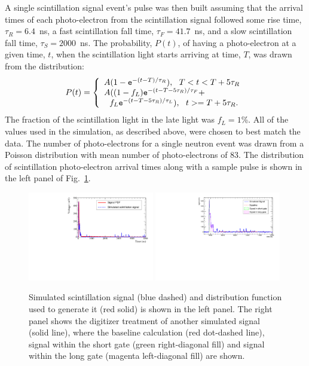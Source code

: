 \documentclass[letter,twocolumn,preprint,3p]{elsarticle}
\begin{document}
A single scintillation signal event's pulse was then built assuming
that the arrival times of each photo-electron from the scintillation
signal followed some rise time, $\tau_R=6.4$~ns, a fast scintillation
fall time, $\tau_F=41.7$~ns, and a slow scintillation fall time,
$\tau_S=2000$~ns.  The probability, $P(t)$, of having a photo-electron
at a given time, $t$, when the scintillation light starts arriving at
time, $T$, was drawn from the distribution:
\begin{equation}
  P(t) = \left\{
    \begin{array}{l}
      A ( 1 - {\tt e}^{-(t-T)/\tau_R } ),\ \ T<t<T+5\tau_R \\
      A ( (1-f_L) {\tt e}^{ -(t-T-5\tau_R)/\tau_F } +   \\
      \ \ f_L {\tt e}^{ -(t-T-5\tau_R)/\tau_L } ),\ \  t>=T+5\tau_R.
    \end{array}
    \right.
\end{equation}
The fraction of the scintillation light in the late light was
$f_L=1$\%.  All of the values used in the simulation, as described
above, were chosen to best match the data.  The number of
photo-electrons for a single neutron event was drawn from a Poisson
distribution with mean number of photo-electrons of 83.  The
distribution of scintillation photo-electron arrival times along with
a sample pulse is shown in the left panel of Fig.~\ref{fig:signalpdf}.

\begin{figure}[!htpb]
\centering
\includegraphics[width=0.49\textwidth]{figures/signalpulse.pdf}
\includegraphics[width=0.49\textwidth]{figures/digisimexample.pdf}
\caption{ Simulated scintillation signal (blue dashed) and
  distribution function used to generate it (red solid) is shown in
  the left panel.  The right panel shows the digitizer treatment of
  another simulated signal (solid line), where the baseline
  calculation (red dot-dashed line), signal within the short gate
  (green right-diagonal fill) and signal within the long gate (magenta
  left-diagonal fill) are shown.}\label{fig:signalpdf}
\end{figure}
\end{document}

